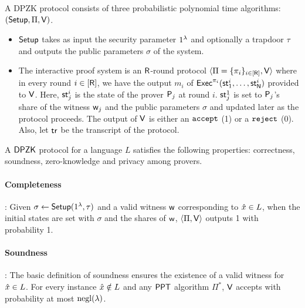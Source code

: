 A DPZK protocol consists of three probabilistic polynomial time algorithms: $(\mathsf{Setup}, \Pi, \mathsf{V})$. 
\begin{itemize}
\item $\mathsf{Setup}$ takes as input the security parameter $1^{\lambda}$ and optionally a trapdoor $\tau$ and outputs the public parameters $\sigma$ of the system.
\item The interactive proof system is an $\mathsf{R}$-round protocol $\langle \Pi = \{\pi_i\}_{i \in [\mathsf{R}]}, \mathsf{V} \rangle$ where in every round $i \in [\mathsf{R}]$, we have the output $m_i$ of $\mathsf{Exec}^{\pi_i}(\mathsf{st}^i_1, \ldots, \mathsf{st}^i_{\mathsf{N}})$ provided to $\mathsf{V}$. Here, $\mathsf{st}^i_j$ is the state of the prover $\mathsf{P}_j$ at round $i$. $\mathsf{st}^1_j$ is set to $\mathsf{P}_j$'s share of the witness $\mathsf{w}_j$ and the public parameters $\sigma$ and updated later as the protocol proceeds. The output of $\mathsf{V}$ is either an $\tt accept$ (1) or a $\tt{reject}$ (0). Also, let $\mathsf{tr}$ be the transcript of the protocol.
\end{itemize}
A $\mathsf{DPZK}$ protocol for a language $L$ satisfies the following properties: 
correctness, soundness, zero-knowledge and privacy among provers.
\paragraph{Completeness}: %
Given $\sigma \gets \mathsf{Setup}(1^{\lambda}, \tau)$ and a valid witness $\mathsf{w}$ corresponding to $\hat{x} \in L$, when the initial states are set with $\sigma$ and the shares of $\mathsf{w}$, $\langle \Pi, \mathsf{V} \rangle$ outputs 1 with probability 1.

\paragraph{Soundness}:  The basic definition of soundness ensures the existence of a valid witness for $\hat{x} \in L$. For every instance $\hat{x} \notin L$ and any $\mathsf{PPT}$ algorithm $\Pi^*$, $\mathsf{V}$ accepts with probability at most $\mathrm{negl}({\lambda})$.


